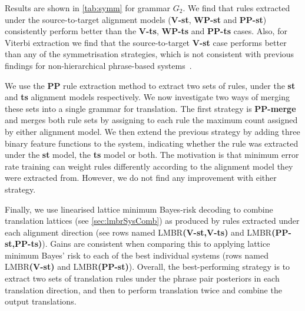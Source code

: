Results are shown in \autoref{tab:symm} for grammar $G_2$. We find that rules
extracted under the source-to-target alignment models ({\bf V-st}, {\bf WP-st}
and {\bf PP-st}) consistently perform better than the {\bf V-ts}, {\bf WP-ts}
and {\bf PP-ts} cases. Also, for Viterbi extraction we find that the
source-to-target {\bf V-st} case performs better than any of the symmetrisation
strategies, which is not consistent with previous findings for non-hierarchical
phrase-based systems~\citep{koehn-och-marcu:2003:NAACL}.

We use the {\bf PP} rule extraction method to extract two sets of rules, under
the {\bf st} and {\bf ts} alignment models respectively. We now investigate two
ways of merging these sets into a single grammar for translation. The first
strategy is {\bf PP-merge} and merges both rule sets by assigning to each rule
the maximum count assigned by either alignment model. We then extend the
previous strategy by adding three binary feature functions to the system,
indicating whether the rule was extracted under the {\bf st} model, the
{\bf ts} model or both. The motivation is that minimum error rate training can
weight rules differently according to the alignment model they were extracted
from. However, we do not find any improvement with either strategy.

Finally, we use linearised lattice minimum Bayes-risk
decoding
to combine translation
lattices (see \autoref{sec:lmbrSysComb}) as produced by
rules extracted under each alignment direction (see rows named
LMBR{\bf(V-st,V-ts)} and LMBR{\bf(PP-st,PP-ts)}). Gains are consistent when
comparing this to applying lattice minimum Bayes' risk to each of the best
individual systems (rows named LMBR{\bf(V-st)} and LMBR{\bf(PP-st)}). Overall,
the best-performing strategy is to extract two sets of translation rules under
the phrase pair posteriors in each translation direction, and then to perform
translation twice and combine the output translations.

